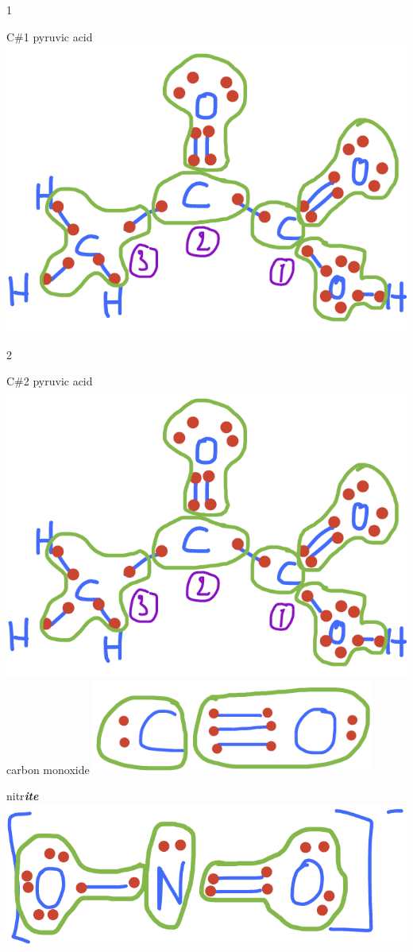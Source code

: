 \documentclass[]{book}
\theoremstyle{definition}
\theoremstyle{definition}
\theoremstyle{definition}
\theoremstyle{remark}
\begin{document}
1

C\#1 pyruvic acid~\includegraphics{pictures/ElecAlloc_pyruvic_acid.png}

2

C\#2 pyruvic acid~\includegraphics{pictures/ElecAlloc_pyruvic_acid.png}
carbon monoxide
\includegraphics[width=0.70000\textwidth]{pictures/ElecAlloc_CO.png}

nitr\emph{\textbf{ite}}~\includegraphics{pictures/ElecAlloc_NO2-.png}
\end{document}
